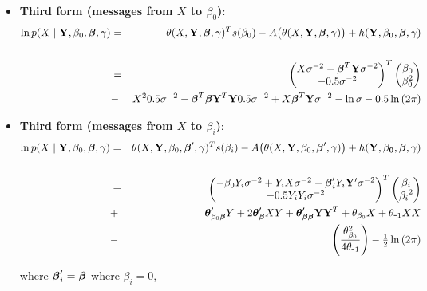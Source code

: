 \documentclass[11pt, oneside]{article}   	%
\numberwithin{figure}{section}
\numberwithin{equation}{section}
\numberwithin{table}{section}
\theoremstyle{definition}
\begin{document}
\begin{appendices}
\begin{itemize}
\item \textbf{Third form (messages from $X$ to $\beta_0$)}:
\begin{eqnarray*}
\ln p(X\mid \mathbf{Y},\beta_0,\boldsymbol \beta,\gamma) &=& \theta(X,\mathbf Y,\boldsymbol \beta,\gamma)^T s(\beta_0) - A \big(\theta(X,\mathbf Y,\boldsymbol \beta,\gamma) \big) + h(\mathbf{Y,\beta_0,\boldsymbol \beta,\gamma})\\\\
&=&
\begin{pmatrix}
X\sigma^{-2} - \boldsymbol \beta^T \mathbf Y \sigma^{-2} \\
-0.5\sigma^{-2}
\end{pmatrix}^T
\begin{pmatrix}
\beta_0\\
\beta_0^2\\
\end{pmatrix}\\
&-& X^2 0.5\sigma^{-2} - \boldsymbol \beta^T \boldsymbol \beta \mathbf Y^T \mathbf Y 0.5\sigma^{-2}  + X\boldsymbol \beta^T \mathbf Y \sigma^{-2} - \ln{\sigma} - 0.5\ln{(2\pi)}
\end{eqnarray*}


\item \textbf{Third form (messages from $X$ to $\beta_i$)}:
\begin{eqnarray*}
\ln p(X\mid \mathbf{Y},\beta_0,\boldsymbol \beta,\gamma) &=& \theta(X,\mathbf Y,\beta_0,\boldsymbol \beta',\gamma)^T s(\beta_i) - A \big(\theta(X,\mathbf Y,\beta_0,\boldsymbol \beta',\gamma) \big) + h(\mathbf{Y,\beta_0,\boldsymbol \beta,\gamma})\\\\
&=&
\begin{pmatrix}
-\beta_0 Y_i \sigma^{-2} + Y_i X \sigma^{-2} - \boldsymbol \beta_i' Y_i \mathbf Y' \sigma^{-2} \\
-0.5Y_iY_i \sigma^{-2}
\end{pmatrix}^T
\begin{pmatrix}
\beta_i\\
{\beta_i}^2\\
\end{pmatrix}\\
&+& \boldsymbol \theta_{\beta_0\boldsymbol \beta}'Y + 2\boldsymbol \theta_{\boldsymbol \beta}'XY  + \boldsymbol \theta_{\boldsymbol \beta\boldsymbol \beta}'\mathbf Y\mathbf Y^T + \theta_{\beta_0}X + \theta_{\mbox{-}1}XX \\
&-& \left( \frac{\theta_{\beta_0}^2}{4\theta_{\mbox{-}1}} \right) - \tfrac{1}{2}\ln{(2\pi)}
\end{eqnarray*}

where $\boldsymbol \beta_i' = \boldsymbol \beta$ where $\beta_i = 0$,\\



\end{itemize}
\end{appendices}
\end{document}
